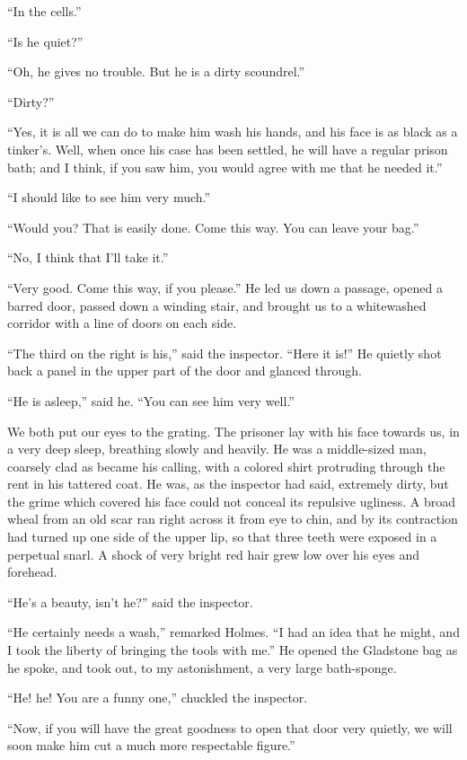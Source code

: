 “In the cells.”

“Is he quiet?”

“Oh, he gives no trouble. But he is a dirty scoundrel.”

“Dirty?”

“Yes, it is all we can do to make him wash his hands, and
his face is as black as a tinker’s. Well, when once his case
has been settled, he will have a regular prison bath; and I
think, if you saw him, you would agree with me that he needed
it.”

“I should like to see him very much.”

“Would you? That is easily done. Come this way. You
can leave your bag.”

“No, I think that I’ll take it.”

“Very good. Come this way, if you please.” He led us
down a passage, opened a barred door, passed down a winding
stair, and brought us to a whitewashed corridor with a
line of doors on each side.

“The third on the right is his,” said the inspector. “Here
it is!” He quietly shot back a panel in the upper part of the
door and glanced through.

“He is asleep,” said he. “You can see him very well.”

We both put our eyes to the grating. The prisoner lay
with his face towards us, in a very deep sleep, breathing slowly
and heavily. He was a middle-sized man, coarsely clad as
became his calling, with a colored shirt protruding through the
rent in his tattered coat. He was, as the inspector had said,
extremely dirty, but the grime which covered his face could
not conceal its repulsive ugliness. A broad wheal from an
old scar ran right across it from eye to chin, and by its
contraction had turned up one side of the upper lip, so that
three teeth were exposed in a perpetual snarl. A shock of
very bright red hair grew low over his eyes and forehead.

“He’s a beauty, isn’t he?” said the inspector.

“He certainly needs a wash,” remarked Holmes. “I had
an idea that he might, and I took the liberty of bringing the
tools with me.” He opened the Gladstone bag as he spoke,
and took out, to my astonishment, a very large bath-sponge.

“He! he! You are a funny one,” chuckled the
inspector.

“Now, if you will have the great goodness to open that
door very quietly, we will soon make him cut a much more
respectable figure.”

